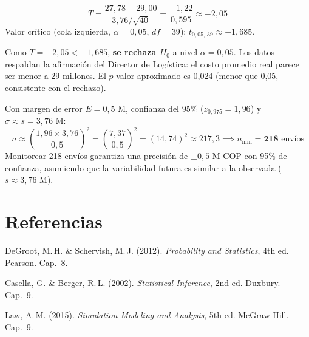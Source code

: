 \documentclass[11pt, letterpaper]{article}
\begin{document}
\begin{resultadobox}
\[
T = \frac{27{,}78 - 29{,}00}{3{,}76/\sqrt{40}} = \frac{-1{,}22}{0{,}595} \approx -2{,}05
\]
Valor crítico (cola izquierda, $\alpha=0{,}05$, $df=39$): $t_{0{,}05,\,39} \approx -1{,}685$.

Como $T = -2{,}05 < -1{,}685$, \textbf{se rechaza $H_0$} a nivel $\alpha = 0{,}05$. Los datos respaldan la afirmación del Director de Logística: el costo promedio real parece ser menor a 29 millones. El $p$-valor aproximado es 0{,}024 (menor que 0{,}05, consistente con el rechazo).
\end{resultadobox}

\begin{resultadobox}
Con margen de error $E = 0{,}5$ M, confianza del 95\% ($z_{0{,}975} = 1{,}96$) y $\sigma \approx s = 3{,}76$ M:
\[
n \approx \left(\frac{1{,}96 \times 3{,}76}{0{,}5}\right)^2 = \left(\frac{7{,}37}{0{,}5}\right)^2 = (14{,}74)^2 \approx 217{,}3 \implies n_{\min} = \mathbf{218} \text{ envíos}
\]
Monitorear 218 envíos garantiza una precisión de $\pm 0{,}5$ M COP con 95\% de confianza, asumiendo que la variabilidad futura es similar a la observada ($s \approx 3{,}76$ M).
\end{resultadobox}

\section*{Referencias}
\begin{enumerate}[label={[\arabic*]}]
    \item DeGroot, M.\,H. \& Schervish, M.\,J. (2012). \textit{Probability and Statistics}, 4th ed. Pearson. Cap.~8.
    \item Casella, G. \& Berger, R.\,L. (2002). \textit{Statistical Inference}, 2nd ed. Duxbury. Cap.~9.
    \item Law, A.\,M. (2015). \textit{Simulation Modeling and Analysis}, 5th ed. McGraw-Hill. Cap.~9.
\end{enumerate}
\end{document}
